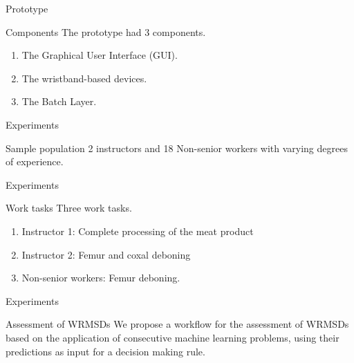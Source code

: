 \begin{frame}{Prototype}
    \begin{alertblock}{Components}
        The prototype had 3 components.
        \begin{enumerate}
            \item The Graphical User Interface (GUI).
            \item The wristband-based devices.
            \item The Batch Layer.
        \end{enumerate}
    \end{alertblock}
\end{frame}

\begin{frame}{Experiments}
\begin{alertblock}{Sample population}
    2 instructors and 18 Non-senior workers with varying degrees of experience.
\end{alertblock}    
\end{frame}



\begin{frame}{Experiments}
    \begin{alertblock}{Work tasks}
      Three work tasks. 
      \begin{enumerate}
          \item Instructor 1: Complete processing of the meat product
          \item Instructor 2: Femur and coxal deboning
          \item Non-senior workers: Femur deboning.
      \end{enumerate}
    \end{alertblock}
\end{frame}

\begin{frame}{Experiments}
    \begin{alertblock}{Assessment of WRMSDs}
        We propose a workflow for the assessment of WRMSDs based on the application of consecutive machine learning problems, using their predictions as input for a decision making rule.
    \end{alertblock}
\end{frame}